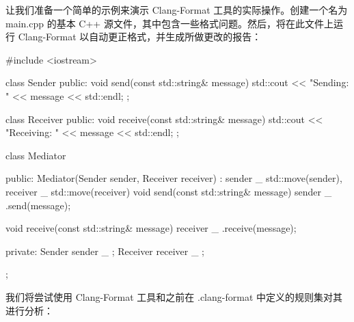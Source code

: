 让我们准备一个简单的示例来演示 Clang-Format 工具的实际操作。创建一个名为 main.cpp 的基本 C++ 源文件，其中包含一些格式问题。然后，将在此文件上运行 Clang-Format 以自动更正格式，并生成所做更改的报告：

\begin{cpp}
#include <iostream>

class Sender {
public:
    void send(const std::string& message) {
        std::cout << "Sending: " << message << std::endl;
    }
};

class Receiver {
public:
    void receive(const std::string& message) {
        std::cout << "Receiving: " << message << std::endl;
    }
};

class Mediator {
public:
    Mediator(Sender sender, Receiver receiver)
        : sender _ {std::move(sender)}, receiver _ {std::move(receiver)} {}
    void send(const std::string& message) {
        sender _ .send(message);
    }

    void receive(const std::string& message) {
        receiver _ .receive(message);
    }

private:
    Sender sender _ ;
    Receiver receiver _ ;
};
\end{cpp}

我们将尝试使用 Clang-Format 工具和之前在 .clang-format 中定义的规则集对其进行分析：

